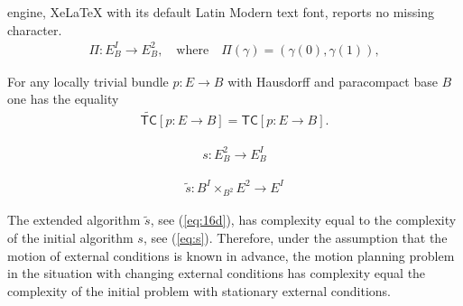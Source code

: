 \documentclass[10pt,a4paper]{amsart}
\def\tc{{\mathsf{TC}}}
\begin{document}
engine, XeLaTeX with its default Latin Modern text font, reports no missing character.
\begin{eqnarray}\label{pi}
\Pi: E^I_B \to E^2_B, \quad \mbox{where}\quad \Pi(\gamma) =(\gamma(0), \gamma(1)),
\end{eqnarray}

\begin{theorem}\label{thm:8}
For any locally trivial bundle $p:E\to B$ with Hausdorff and paracompact base $B$ one has the equality
\begin{eqnarray}\label{in:11}
\widetilde\tc[p:E\to B]= \tc[p:E\to B].
\end{eqnarray}  
\end{theorem}

\begin{eqnarray}\label{eq:s}
s: E^2_B\to E^I_B
\end{eqnarray}

\begin{eqnarray}\label{eq:16d}
\tilde s: B^I\times_{B^2}E^2\to E^I
\end{eqnarray}

\begin{theorem}\label{comp}
The extended algorithm $\tilde s$, see (\ref{eq:16d}), has complexity equal to the complexity of the initial algorithm $s$, see (\ref{eq:s}). 
Therefore, under the assumption that the motion of external conditions is known in advance, the motion planning problem in the situation with changing external conditions has complexity equal the complexity of the initial problem with stationary external conditions.
\end{theorem}
\end{document}
